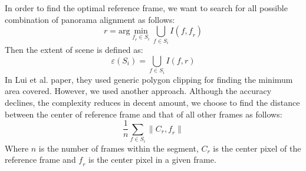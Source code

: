 \documentclass[12pt]{article}
\begin{document}
In order to find the optimal reference frame, we want to search for all possible combination of panorama alignment as follows:
\begin{equation}
\mathit{r} = \mathrm{arg} \min_{\mathit{f_r} \in \mathit{S_i}} \bigcup_{\mathit{f} \in \mathit{S_i}} \mathit{I(f, f_r)}
\end{equation}
Then the extent of scene is defined as:
\begin{equation}
\varepsilon(\mathit{S_i}) = \bigcup_{\mathit{f} \in \mathit{S_i}} \mathit{I(f, r)}
\end{equation}
In Lui et al. paper, they used generic polygon clipping for finding the minimum area covered. However, we used another approach.  Although the accuracy declines, the complexity reduces in decent amount, we choose to find the distance between the center of reference frame and that of all other frames as follows:
\begin{equation}
\frac{1}{\mathit{n}} \sum_{\mathit{f \in S_i}}  \lVert \mathit{C_r}, \mathit{f_r} \rVert
\end{equation}
Where $\mathit{n}$ is the number of frames within the segment, $\mathit{C_r}$ is the center pixel of the reference frame and $\mathit{f_r}$ is the center pixel in a given frame.
\end{document}
